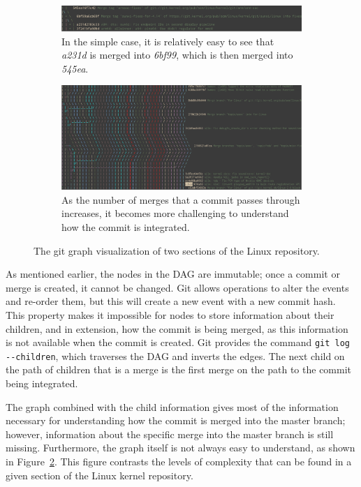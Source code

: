 \begin{figure}[htpb]
  \centering
  \begin{subfigure}[b]{0.8\textwidth}
    \includegraphics[width=\textwidth]{Figures/background/git_graph.png}
    \caption{In the simple case, it is relatively easy to see
      that \textit{a231d} is merged into \textit{6bf99},
      which is then merged into \textit{545ea}.}
    \label{fig:trivial_graph}
  \end{subfigure}

  \begin{subfigure}[b]{0.8\textwidth}
    \includegraphics[width=\textwidth]{Figures/background/git_graph_complex.png}
    \caption{As the number of merges that a commit passes through
      increases, it becomes more challenging to understand how the
      commit is integrated.}
  \end{subfigure}
  \caption{The git graph visualization of two sections of the Linux
    repository.}
  \label{fig:git_graphs}
\end{figure}

As mentioned earlier, the nodes in the DAG are immutable;
once a commit or merge is created, it cannot be changed.
Git allows operations to alter the events and re-order them,
but this will create a new event with a new commit hash.
This property makes it impossible for nodes to store information about
their children, and in extension, how the commit is being merged, as
this information is not available when the commit is created.
Git provides the command \verb|git log --children|, which traverses the
DAG and inverts the edges.
The next child on the path of children that is a merge is the first
merge on the path to the commit being integrated.

The graph combined with the child information gives most of the
information necessary for understanding how the commit is
merged into the master branch; however, information about the specific
merge into the master branch is still missing.
Furthermore, the graph itself is not always easy to understand, as shown
in Figure~\ref{fig:git_graphs}.
This figure contrasts the levels of complexity that can be found in a
given section of the Linux kernel repository.

